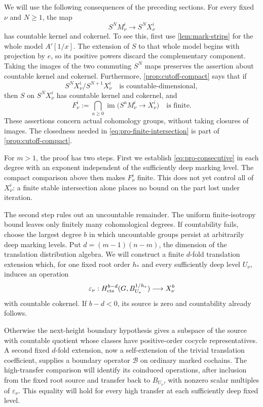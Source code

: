 We will use the following consequences of the preceding sections.
For every fixed $\nu$ and $N\geq1$, the map
\[
 S^NM^i_\nu\longrightarrow S^NX^i_\nu
\]
has countable kernel and cokernel.  To see this, first use
\cref{lem:mark-strips} for the whole model $A'[1/x]$.  The extension of
$S$ to that whole model begins with projection by $e$, so its positive
powers discard the complementary component.  Taking the images of the
two commuting $S^N$ maps preserves the assertion about countable kernel
and cokernel.  Furthermore, \cref{prop:cutoff-compact} says that if
\begin{equation}
\label{eq:pro-consecutive}
 S^NX^i_\nu/S^{N+1}X^i_\nu\quad\text{is countable-dimensional},
\end{equation}
then $S$ on $S^NX^i_\nu$ has countable kernel and cokernel, and
\begin{equation}
\label{eq:pro-finite-intersection}
 F^i_\nu:={\bigcap}_{a\geq0}
 \operatorname{im}\bigl(S^aM^i_\nu\longrightarrow X^i_\nu\bigr)
 \quad\text{is finite}.
\end{equation}
These assertions concern actual cohomology groups, without taking
closures of images.  The closedness needed in
\cref{eq:pro-finite-intersection} is part of
\cref{prop:cutoff-compact}.

For $m>1$, the proof has two steps. First we establish
\cref{eq:pro-consecutive} in each degree with an exponent independent
of the sufficiently deep marking level. The compact comparison above then
makes $F^i_\nu$ finite. This does not yet control all of $X^i_\nu$:
a finite stable intersection alone places no bound on the part lost
under iteration.

The second step rules out an uncountable remainder. The uniform
finite-isotropy bound leaves only finitely many cohomological degrees.
If countability fails, choose the largest degree $b$ in which
uncountable groups persist at arbitrarily deep marking levels. Put
$d=(m-1)(n-m)$, the dimension of the translation distribution algebra.
We will construct a finite $d$-fold translation extension which, for one fixed
root order $h_*$ and every sufficiently deep level $U_\nu$, induces an
operation
\[
 \varepsilon_\nu:
 H^{b-d}_{\mathrm{cts}}(G,B_{U_\nu}^{1/h_*})\longrightarrow X^b_\nu
\]
with countable cokernel. If $b-d<0$, its source is zero and countability
already follows.

Otherwise the next-height boundary hypothesis gives a subspace of the
source with countable quotient whose classes have positive-order cocycle
representatives. A second fixed $d$-fold extension, now a self-extension
of the trivial translation coefficient, supplies a boundary operator
$\mathcal B$ on ordinary marked cochains. The high-transfer comparison
will identify its coinduced operations, after inclusion from the fixed
root source and transfer back to $B_{U_\nu}$, with nonzero scalar
multiples of $\varepsilon_\nu$. This equality will hold for
every high transfer at each sufficiently deep fixed level.

